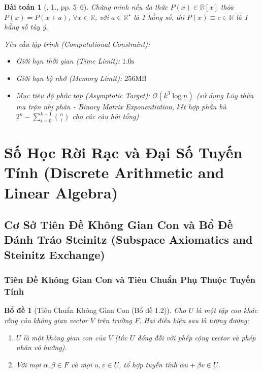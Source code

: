 \documentclass{article}
\newtheorem{baitoan}{Bài toán}
\newtheorem{bode}{Bổ đề}
\begin{document}
\begin{baitoan}[\cite{Chung_pth_da_thuc}, 1., pp. 5--6]
	Chứng minh nếu đa thức $P(x)\in\mathbb{R}[x]$ thỏa $P(x) = P(x + a)$, $\forall x\in\mathbb{R}$, với $a\in\mathbb{R}^\star$ là 1 hằng số, thì $P(x)\equiv c\in\mathbb{R}$ là 1 hằng số tùy ý.

    \vspace{0.5em}
    \emph{Yêu cầu lập trình (Computational Constraint):}
    \begin{itemize}
        \item Giới hạn thời gian (Time Limit): $1.0\mathrm{s}$
        \item Giới hạn bộ nhớ (Memory Limit): $256\mathrm{MB}$
        \item Mục tiêu độ phức tạp (Asymptotic Target): $\mathcal{O}(k^3 \log n)$ (sử dụng Lũy thừa ma trận nhị phân - Binary Matrix Exponentiation, kết hợp phần bù $2^n - \sum_{i=0}^{k-1} \binom{n}{i}$ cho các câu hỏi tổng)
    \end{itemize}
\end{baitoan}


\section{Số Học Rời Rạc và Đại Số Tuyến Tính (Discrete Arithmetic and Linear Algebra)}

\subsection{Cơ Sở Tiên Đề Không Gian Con và Bổ Đề Đánh Tráo Steinitz (Subspace Axiomatics and Steinitz Exchange)}

\subsubsection*{Tiên Đề Không Gian Con và Tiêu Chuẩn Phụ Thuộc Tuyến Tính}

\begin{bode}[Tiêu Chuẩn Không Gian Con (Bổ đề 1.2)]
Cho $U$ là một tập con khác rỗng của không gian vector $V$ trên trường $F$. Hai điều kiện sau là tương đương:
\begin{enumerate}
    \item[(i)] $U$ là một không gian con của $V$ (tức $U$ đóng đối với phép cộng vector và phép nhân vô hướng).
    \item[(ii)] Với mọi $\alpha, \beta \in F$ và mọi $u, v \in U$, tổ hợp tuyến tính $\alpha u + \beta v \in U$.
\end{enumerate}
\end{bode}
\end{document}
